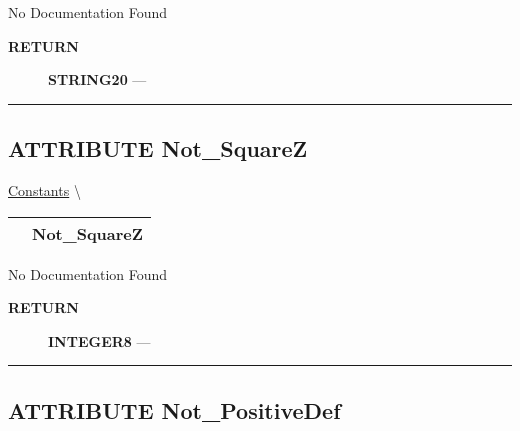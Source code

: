 \par





No Documentation Found








\par
\begin{description}
\item [\colorbox{tagtype}{\color{white} \textbf{\textsf{RETURN}}}] \textbf{STRING20} --- 
\end{description}




\rule{\linewidth}{0.5pt}
\subsection*{\textsf{\colorbox{headtoc}{\color{white} ATTRIBUTE}
Not\_SquareZ}}

\hypertarget{ecldoc:pbblas.constants.not_squarez}{}
\hspace{0pt} \hyperlink{ecldoc:PBblas.Constants}{Constants} \textbackslash 

{\renewcommand{\arraystretch}{1.5}
\begin{tabularx}{\textwidth}{|>{\raggedright\arraybackslash}l|X|}
\hline
\hspace{0pt}\mytexttt{\color{red} } & \textbf{Not\_SquareZ} \\
\hline
\end{tabularx}
}

\par





No Documentation Found








\par
\begin{description}
\item [\colorbox{tagtype}{\color{white} \textbf{\textsf{RETURN}}}] \textbf{INTEGER8} --- 
\end{description}




\rule{\linewidth}{0.5pt}
\subsection*{\textsf{\colorbox{headtoc}{\color{white} ATTRIBUTE}
Not\_PositiveDef}}


